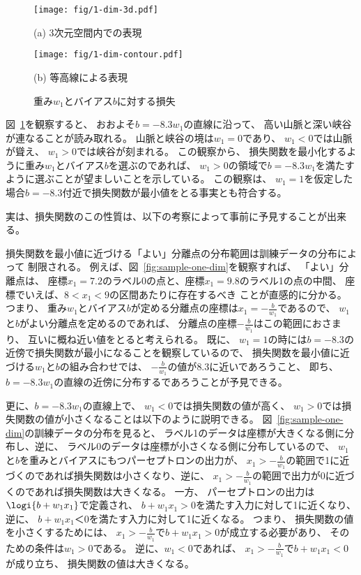 \begin{figure}
  \centering
    \texttt{[image: fig/1-dim-3d.pdf]}

    (a) 3次元空間内での表現
    \vspace{5mm}

    \texttt{[image: fig/1-dim-contour.pdf]}
    
    (b) 等高線による表現

  \caption{重み$w_1$とバイアス$b$に対する損失}
\label{fig:rss-weight-bias}
\end{figure}

図~\ref{fig:rss-weight-bias}を観察すると、
おおよそ$b = -8.3 w_1$の直線に沿って、
高い山脈と深い峡谷が連なることが読み取れる。
山脈と峡谷の境は$w_1 = 0$であり、
$w_1 < 0$では山脈が聳え、
$w_1 > 0$では峡谷が刻まれる。
この観察から、
損失関数を最小化するように重み$w_1$とバイアス$b$を選ぶのであれば、
$w_1 > 0$の領域で$b = -8.3w_1$を満たすように選ぶことが望ましいことを示している。
この観察は、
$w_1 = 1$を仮定した場合$b = -8.3$付近で損失関数が最小値をとる事実とも符合する。

実は、損失関数のこの性質は、以下の考察によって事前に予見することが出来る。

損失関数を最小値に近づける「よい」分離点の分布範囲は訓練データの分布によって
制限される。
例えば、図~\ref{fig:sample-one-dim}を観察すれば、
「よい」分離点は、
座標$x_1 = 7.2$のラベル0の点と、座標$x_1 = 9.8$のラベル1の点の中間、
座標でいえば、$8 < x_1 < 9$の区間あたりに存在するべき
ことが直感的に分かる。
つまり、
重み$w_1$とバイアス$b$が定める分離点の座標は$x_1 = -\frac b{w_1}$であるので、
$w_1$と$b$がよい分離点を定めるのであれば、
分離点の座標$-\frac b{w_1}$はこの範囲におさまり、
互いに概ね近い値をとると考えられる。
既に、
$w_1 = 1$の時には$b = -8.3$の近傍で損失関数が最小になることを観察しているので、
損失関数を最小値に近づける$w_1$と$b$の組み合わせでは、
$-\frac b{w_1}$の値が$8.3$に近いであろうこと、
即ち、$b = -8.3w_1$の直線の近傍に分布するであろうことが予見できる。

更に、$b = -8.3w_1$の直線上で、
$w_1<0$では損失関数の値が高く、
$w_1>0$では損失関数の値が小さくなることは以下のように説明できる。
図~\ref{fig:sample-one-dim}の訓練データの分布を見ると、
ラベル1のデータは座標が大きくなる側に分布し、逆に、
ラベル0のデータは座標が小さくなる側に分布しているので、
$w_1$と$b$を重みとバイアスにもつパーセプトロンの出力が、
$x_1 > - \frac b{w_1}$の範囲で1に近づくのであれば損失関数は小さくなり、逆に、
$x_1 > - \frac b{w_1}$の範囲で出力が0に近づくのであれば損失関数は大きくなる。
一方、
パーセプトロンの出力は$\logi{b + w_1x_1}$で定義され、
$b + w_1 x_1 > 0$を満たす入力に対して1に近くなり、逆に、
$b + w_1 x_1 ＜ 0$を満たす入力に対して1に近くなる。
つまり、
損失関数の値を小さくするためには、
$x_1 > -\frac b{w_1}$で$b + w_1x_1 > 0$が成立する必要があり、
そのための条件は$w_1 > 0$である。
逆に、$w_1 < 0$であれば、
$x_1 > -\frac b{w_1}$で$b + w_1x_1 < 0$が成り立ち、
損失関数の値は大きくなる。


